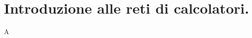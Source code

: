 \documentclass[../DocumentazioneProgetto.tex]{subfiles}
\begin{document}
	\section{Introduzione alle reti di calcolatori.}
A
\end{document}
